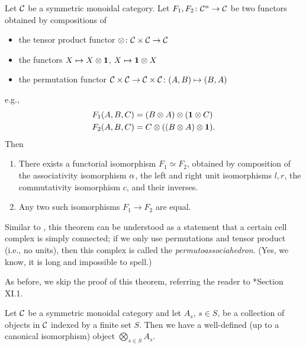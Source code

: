 \begin{theorem}\label{t:maclane-symmetric}\par

  \noindent
  Let $\mathcal{C}$ be a symmetric monoidal category. Let $F_1, F_2\colon \mathcal{C}^n\to
  \mathcal{C}$ be two functors obtained by compositions of
  \begin{itemize}
    \item the tensor product functor $\otimes\colon \mathcal{C}\times \mathcal{C}\to \mathcal{C}$
    \item the functors $X\mapsto X\otimes \mathbf{1}$, $X\mapsto \mathbf{1} \otimes X$
    \item the permutation functor $\mathcal{C}\times \mathcal{C} \to \mathcal{C}\times \mathcal{C}
          \colon (A, B)\mapsto (B,A)$
  \end{itemize}
  e.g.,
  \begin{align*}
    F_1(A,B,C)&=(B\otimes A)\otimes (\mathbf{1}\otimes C)\\
    F_2(A,B,C)&=C\otimes ((B\otimes  A)\otimes \mathbf{1}).
  \end{align*}
  Then
  \begin{enumerate}
    \item There exists a functorial isomorphism $F_1\simeq F_2$, obtained
      by composition of the associativity isomorphism $\alpha$, the left and right
      unit isomorphisms $l,r$, the commutativity isomorphism $c$, and their
      inverses.
    \item Any two such isomorphisms $F_1\to F_2$ are equal.
  \end{enumerate}
\end{theorem}
Similar to , this theorem can be understood as a statement
that a certain cell complex is simply connected; if we only use
permutations and tensor product (i.e., no units), then this complex is
called the \emph{permutoassociahedron}. (Yes, we know, it is long and
impossible to spell.)


As before, we skip the proof of this theorem, referring the reader to
*{Section XI.1}.

\begin{corollary}\label{c:AS}
  Let $\mathcal{C}$ be a symmetric monoidal category and let $A_s$, $s\in S$, be a
  collection of objects in $\mathcal{C}$ indexed by a finite set $S$. Then we have a
  well-defined (up to a canonical isomorphism) object $ \bigotimes_{s\in S}
  A_s$.
\end{corollary}
